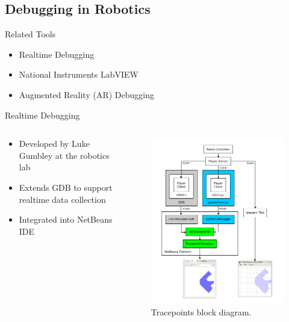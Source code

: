 \documentclass[compress]{beamer}
\begin{document}
\subsection{Debugging in Robotics}

\begin{frame}{Related Tools}
\begin{itemize}
\item Realtime Debugging \cite{Gumbley2009}
\item National Instruments LabVIEW
\item Augmented Reality (AR) Debugging \cite{Collett2010}
\end{itemize}
\end{frame}

\begin{frame}{Realtime Debugging}
\begin{columns}
\begin{column}{.5\textwidth}
\begin{itemize}
\item Developed by Luke Gumbley at the robotics lab
\item Extends GDB to support realtime data collection
\item Integrated into NetBeans IDE
\end{itemize}
\end{column}
\hfill%
\begin{column}{.5\textwidth}
\begin{figure}[htbp]
  \centering
  \includegraphics[width=.75\textwidth]{images/tracepoints_gumbley.png}
  \caption{Tracepoints block diagram. \cite{Gumbley2009}}
\end{figure}
\end{column}
\end{columns}
\end{frame}
\end{document}
